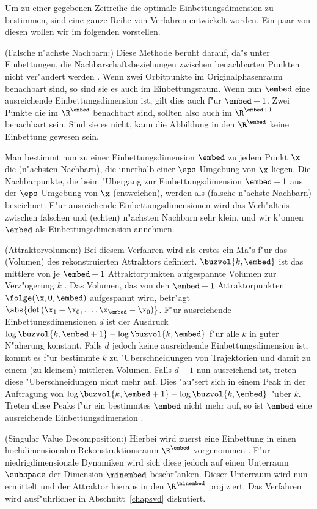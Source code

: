 Um zu einer gegebenen Zeitreihe die optimale Einbettungsdimension zu bestimmen, sind eine
ganze Reihe von Verfahren entwickelt worden. Ein paar von diesen wollen wir im folgenden
vorstellen.
\begin{myitemize}
\item \rem(Falsche n"achste Nachbarn:) Diese Methode beruht darauf, da"s unter
  Einbettungen, die Nachbarschaftsbeziehungen zwischen benachbarten Punkten nicht
  ver\-"an\-dert werden \cite{Kennel92}. Wenn zwei Orbitpunkte im Originalphasenraum benachbart
  sind, so sind sie es auch im Einbettungsraum. Wenn nun $\embed$ eine ausreichende
  Einbettungsdimension ist, gilt dies auch f"ur $\embed+1$. Zwei Punkte die im $\R^\embed$
  benachbart sind, sollten also auch im $\R^{\embed+1}$ benachbart sein. Sind sie es
  nicht, kann die Abbildung in den $\R^\embed$ keine Einbettung gewesen sein.
  
  Man bestimmt nun zu einer Einbettungsdimension $\embed$ zu jedem Punkt $\x$ die
  \begriff(n"achsten Nachbarn), die innerhalb einer $\eps$-Umgebung  von $\x$ liegen. Die
  Nachbarpunkte, die beim "Ubergang zur Einbettungsdimension $\embed+1$ aus der
  $\eps$-Umgebung von $\x$ \metapher(entweichen), werden als \begriff(falsche n"achste
  Nachbarn) bezeichnet. F"ur ausreichende Einbettungsdimensionen wird das Verh"altnis
  zwischen falschen und \metapher(echten) n"achsten Nachbarn sehr klein, und wir
  k"onnen $\embed$ als Einbettungsdimension annehmen.
  
\item \rem(Attraktorvolumen:) Bei diesem Verfahren wird als erstes ein Ma"s f"ur das
  \metapher(Volumen) des rekonstruierten Attraktors definiert. $\buzvol{k,\embed}$ ist das
  mittlere von je $\embed+1$ Attraktorpunkten aufgespannte Volumen zur Verz"ogerung $k$ .
  Das Volumen, das von den $\embed+1$ Attraktorpunkten $\folge(\x,0,\embed)$ aufgespannt
  wird, betr"agt $\abs{\det\left(\x_1-\x_0,\dots,\x_\embed-\x_0\right)}$.  F"ur
  ausreichende Einbettungsdimensionen $d$ ist der Ausdruck
  $\log\buzvol{k,\embed+1}-\log\buzvol{k,\embed}$ f"ur alle $k$ in guter N"aherung
  konstant. Falls $d$ jedoch keine ausreichende Einbettungsdimension ist, kommt es f"ur
  bestimmte $k$ zu "Uberschneidungen von Trajektorien und damit zu einem \naja(zu
  kleinem) mittleren Volumen. Falls $d+1$ nun
  ausreichend ist, treten diese "Uberschneidungen nicht mehr auf. Dies "au"sert sich in
  einem Peak in der Auftragung von $\log\buzvol{k,\embed+1}-\log\buzvol{k,\embed}$ "uber
  $k$. Treten diese Peaks f"ur ein bestimmtes $\embed$ nicht mehr auf, so ist $\embed$
  eine ausreichende Einbettungsdimension \cite{Buzug94,Buzug90a}.

\item \rem(Singular Value Decomposition:) Hierbei
  wird zuerst eine Einbettung in einen hochdimensionalen Rekonstruktionsraum $\R^\embed$
  vorgenommen \cite{Broomhead-king}. F"ur niedrigdimensionale Dynamiken wird sich diese
  jedoch auf einen Unterraum $\subspace$ der Dimension $\minembed$ beschr"anken. Dieser
  Unterraum wird nun ermittelt und der Attraktor hieraus in den $\R^\minembed$ projiziert.
  Das Verfahren wird ausf"uhrlicher in Abschnitt~\ref{chapsvd} diskutiert.
\end{myitemize}
